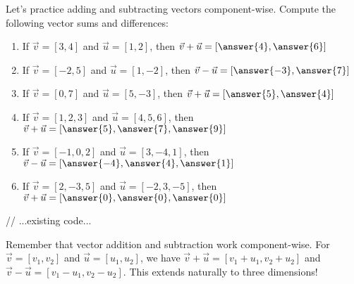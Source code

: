 \documentclass{ximera}
\begin{document}
\begin{problem}
    Let's practice adding and subtracting vectors component-wise. Compute the following vector sums and differences:
    \begin{enumerate}
        \item If $\vec{v}=[3,4]$ and $\vec{u}=[1,2]$, then $\vec{v}+\vec{u}=[\answer{4},\answer{6}]$
        \item If $\vec{v}=[-2,5]$ and $\vec{u}=[1,-2]$, then $\vec{v}-\vec{u}=[\answer{-3},\answer{7}]$
        \item If $\vec{v}=[0,7]$ and $\vec{u}=[5,-3]$, then $\vec{v}+\vec{u}=[\answer{5},\answer{4}]$
        \item If $\vec{v}=[1,2,3]$ and $\vec{u}=[4,5,6]$, then $\vec{v}+\vec{u}=[\answer{5},\answer{7},\answer{9}]$
        \item If $\vec{v}=[-1,0,2]$ and $\vec{u}=[3,-4,1]$, then $\vec{v}-\vec{u}=[\answer{-4},\answer{4},\answer{1}]$
        \item If $\vec{v}=[2,-3,5]$ and $\vec{u}=[-2,3,-5]$, then $\vec{v}+\vec{u}=[\answer{0},\answer{0},\answer{0}]$
    \end{enumerate}
    
 // ...existing code...
    \begin{feedback}
        Remember that vector addition and subtraction work component-wise. For $\vec{v}=[v_1,v_2]$ and $\vec{u}=[u_1,u_2]$, we have $\vec{v}+\vec{u}=[v_1+u_1,v_2+u_2]$ and $\vec{v}-\vec{u}=[v_1-u_1,v_2-u_2]$. This extends naturally to three dimensions!
    \end{feedback}
\end{problem}
\end{document}
